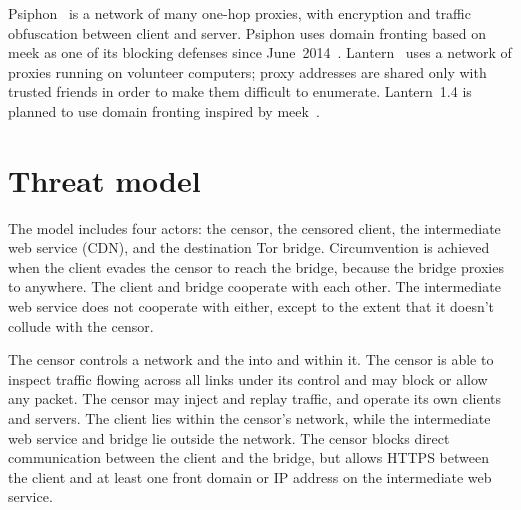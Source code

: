 \documentclass[conference]{IEEEtran}
\begin{document}
Psiphon~\cite{psiphon} is a network of many one-hop proxies,
with encryption and traffic obfuscation between client and server.
Psiphon uses domain fronting based on meek as one of its blocking defenses since June~2014~\cite{psiphon-meek-merge}.
Lantern~\cite{lantern} uses a network of proxies running on volunteer computers;
proxy addresses are shared only with trusted friends in order to make them difficult to enumerate.
Lantern~1.4 is planned to use domain fronting inspired by meek~\cite{lantern-1.3.1}.




\section{Threat model}

The model includes four actors:
the censor,
the censored client,
the intermediate web service (CDN),
and the destination Tor bridge.
Circumvention is achieved when the client evades the censor to reach
the bridge,
because the bridge proxies to anywhere.
The client and bridge cooperate with each other.
The intermediate web service does not cooperate with either,
except to the extent that it doesn't collude with the censor.

The censor controls a network and the into and within it.
The censor is able to inspect traffic flowing across all links under its control
and may block or allow any packet.
The censor may inject and replay traffic, and
operate its own clients and servers.
The client lies within the censor's network,
while the intermediate web service and bridge lie outside the network.
The censor blocks direct communication between the client and the bridge,
but allows HTTPS between the client and at least one front domain or IP address
on the intermediate web service.

\end{document}
